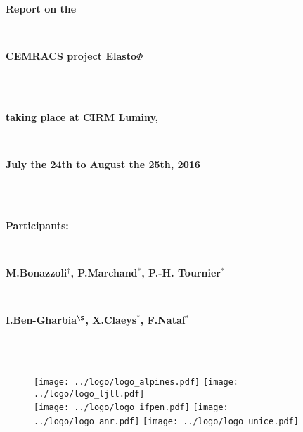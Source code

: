 
\thispagestyle{empty}

\centerline{\textbf{\huge Report on the}}
\quad\\[5pt]
\centerline{\textbf{\huge CEMRACS project Elasto$\Phi$}}
\quad\\[5pt]
\vspace{1cm}
\quad\\
\centerline{\textbf{\Large taking place at CIRM Luminy,}}\quad\\[5pt]
\centerline{\textbf{\Large July the 24th to August the 25th, 2016}}\quad\\[5pt]
\vspace{1cm}
\quad\\
\centerline{\textbf{\Large Participants:}}\quad\\[15pt]
\centerline{\textbf{\Large M.Bonazzoli$^{\dagger}$, P.Marchand$^{*}$, P.-H. Tournier$^{*}$}}\quad\\[5pt]
\centerline{\textbf{\Large I.Ben-Gharbia$^{\S}$, X.Claeys$^{*}$, F.Nataf$^{*}$}}\quad\\[5pt]
\vspace{0.25cm}\quad\\
\vspace{-0.2cm}
\vspace{-0.2cm}
\vspace{-0.2cm}



\vspace{2cm}
\begin{figure}[h!]

\hspace{2.25cm}\texttt{[image: ../logo/logo\_alpines.pdf]}
\hspace{0.5cm}\texttt{[image: ../logo/logo\_ljll.pdf]}\\[10pt]

\hspace{0.5cm}\texttt{[image: ../logo/logo\_ifpen.pdf]}
\hspace{0.5cm}\texttt{[image: ../logo/logo\_anr.pdf]}
\hspace{0.5cm}\texttt{[image: ../logo/logo\_unice.pdf]}

\end{figure}

